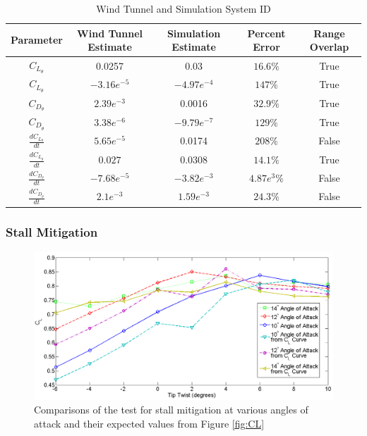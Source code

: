 \documentclass[11pt]{ucthesis}
\begin{document}

\begin{table}[h]
\begin{center}
\caption{Wind Tunnel and Simulation System ID}
\label{tab:WTSystemID}
\begin{tabular}{ c|c|c|c|c}
Parameter&Wind Tunnel Estimate&Simulation Estimate&Percent Error& Range Overlap\\\hline
$C_{L_{\theta}}$&0.0257&0.03&$16.6\%$&True\\
$C_{L_{\dot{\theta}}}$&$-3.16e^{-5}$&$-4.97e^{-4}$&$147\%$&True\\
$C_{D_{\theta}}$&$2.39e^{-3}$&0.0016&$32.9\%$&True\\
$C_{D_{\dot{\theta}}}$&$3.38e^{-6}$&$-9.79e^{-7}$&$129\%$&True\\
$\frac{dC_{L_{\theta}}}{dt}$&$5.65e^{-5}$&0.0174&$208\%$&False\\
$\frac{dC_{L_{\dot{\theta}}}}{dt}$&$0.027$&$0.0308$&$14.1\%$&True\\
$\frac{dC_{D_{\theta}}}{dt}$&$-7.68e^{-5}$&$-3.82e^{-3}$&$4.87e^3\%$&False\\
$\frac{dC_{D_{\dot{\theta}}}}{dt}$&$2.1e^{-3}$&$1.59e^{-3}$&$24.3\%$&False\\
\end{tabular}
\end{center}
\end{table}  

\subsubsection{Stall Mitigation}

\begin{figure}[thpb]
\centering
\includegraphics[width=0.75\linewidth]{Figures/StallMitigationCompare.png}
\caption{Comparisons of the test for stall mitigation at various angles of attack and their expected values from Figure \ref{fig:CL}}
\label{fig:SM}
\end{figure}
\end{document}
